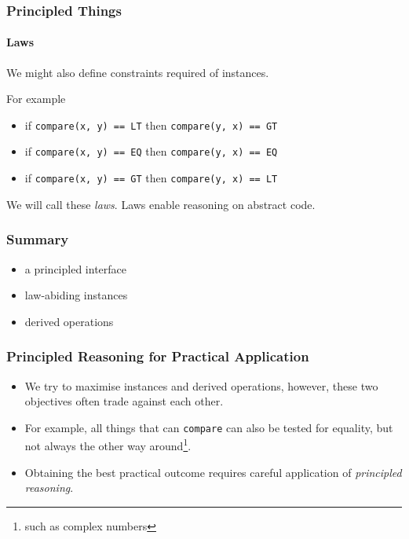 \begin{frame}
\frametitle{Principled Things}
\framesubtitle{Laws}
We might also define constraints required of instances.
\begin{block}{For example}
\begin{itemize}
\item if \lstinline{compare(x, y) == LT} then \lstinline{compare(y, x) == GT}
\item if \lstinline{compare(x, y) == EQ} then \lstinline{compare(y, x) == EQ}
\item if \lstinline{compare(x, y) == GT} then \lstinline{compare(y, x) == LT}
\end{itemize}
\end{block}
We will call these \emph{laws}. Laws enable reasoning on abstract code.
\end{frame}

\begin{frame}
\frametitle{Summary}
\begin{itemize}
\item a principled interface
\item law-abiding instances
\item derived operations
\end{itemize}
\end{frame}

\begin{frame}
\frametitle{Principled Reasoning for Practical Application}
\begin{itemize}
\item We try to maximise instances and derived operations, however, these two objectives often trade against each other.
\item For example, all things that can \lstinline{compare} can also be tested for equality, but not always the other way around\footnote{such as complex numbers}.
\item Obtaining the best practical outcome requires careful application of \emph{principled reasoning}.
\end{itemize}
\end{frame}
